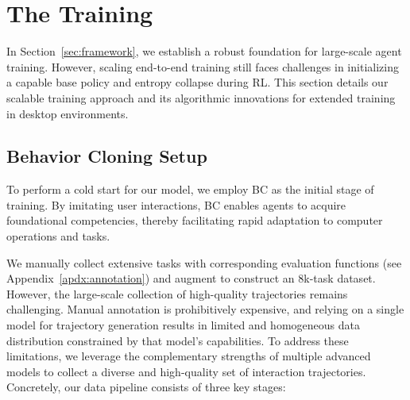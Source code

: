 \section{The \computerrl Training}\label{sec:training}
In Section~\ref{sec:framework}, we establish a robust foundation for large-scale agent training. 
However, scaling end-to-end training still faces challenges in initializing a capable base policy and entropy collapse during RL.
This section details our scalable \computerrl training approach and its algorithmic innovations for extended training in desktop environments.

\subsection{Behavior Cloning Setup}\label{sec:bc-training}
To perform a cold start for our model, we employ BC as the initial stage of training. By imitating user interactions, BC enables agents to acquire foundational competencies, thereby facilitating rapid adaptation to computer operations and tasks. 

We manually collect extensive tasks with corresponding evaluation functions (see Appendix~\ref{apdx:annotation}) and augment to construct an 8k-task dataset.
However, the large-scale collection of high-quality trajectories remains challenging. Manual annotation is prohibitively expensive, and relying on a single model for trajectory generation results in limited and homogeneous data distribution constrained by that model's capabilities.
To address these limitations, we leverage the complementary strengths of multiple advanced models to collect a diverse and high-quality set of interaction trajectories. Concretely, our data pipeline consists of three key stages:

